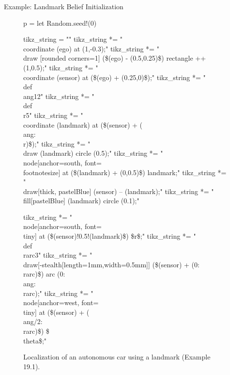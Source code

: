 \begin{frame}[fragile]{Example: Landmark Belief Initialization}

\begin{figure}
    \caption{Localization of an autonomous car using a landmark (Example 19.1).}
    \begin{center}
        \begin{jlcode}
            p = let
                Random.seed!(0)

                tikz_string = ""
                tikz_string *= "\\coordinate (ego) at (1,-0.3);\n"
                tikz_string *= "\\draw [rounded corners=1] (\$(ego) - (0.5,0.25)\$) rectangle ++(1,0.5);\n"
                tikz_string *= "\\coordinate (sensor) at (\$(ego) + (0.25,0)\$);\n"
                tikz_string *= "\\def\\ang{12}\n"
                tikz_string *= "\\def\\r{5}\n"
                tikz_string *= "\\coordinate (landmark) at (\$(sensor) + (\\ang:\\r)\$);\n"
                tikz_string *= "\\draw (landmark) circle (0.5);\n"
                tikz_string *= "\\node[anchor=south, font=\\footnotesize] at (\$(landmark) + (0,0.5)\$) {landmark};\n"
                tikz_string *= "\\draw[thick, pastelBlue] (sensor) -- (landmark);\n"
                tikz_string *= "\\fill[pastelBlue] (landmark) circle (0.1);\n\n"

                tikz_string *= "\\node[anchor=south, font=\\tiny] at (\$(sensor)!0.5!(landmark)\$) {\$r\$};"
                tikz_string *= "\\def\\rarc{3}"
                tikz_string *= "\\draw[-{stealth[length=1mm,width=0.5mm]}] (\$(sensor) + (0:\\rarc)\$) arc (0:\\ang:\\rarc);"
                tikz_string *= "\\node[anchor=west, font=\\tiny] at (\$(sensor) + (\\ang/2:\\rarc)\$) {\$\\theta\$};"


\end{jlcode}
\end{center}
\end{figure}
\end{frame}

